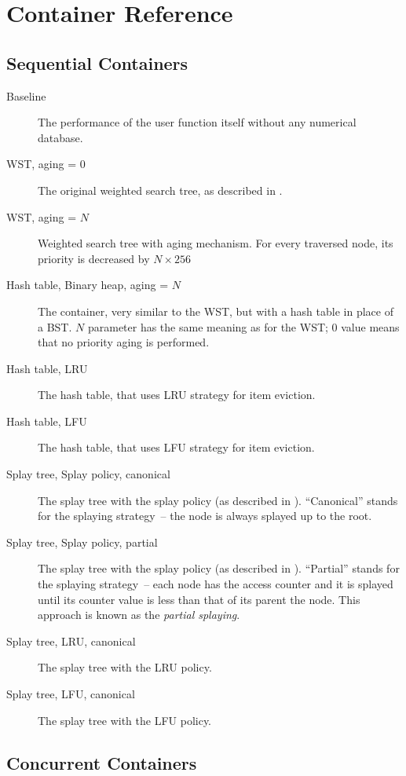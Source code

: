 
\chapter{Container Reference}


\section{Sequential Containers}
\begin{description}
\item[Baseline] The performance of the user function itself without any numerical database.
\item[WST, aging = 0] The original weighted search tree, as described in \cite{park94}.
\item[WST, aging = $N$] Weighted search tree with aging mechanism. For every traversed node, its priority is decreased by $N \times 256$
\item[Hash table, Binary heap, aging = $N$] The container, very similar to the WST, but with a hash table in place of a BST. $N$ parameter has the same meaning as for the WST; 0 value means that no priority aging is performed.
\item[Hash table, LRU] The hash table, that uses LRU strategy for item eviction.
\item[Hash table, LFU] The hash table, that uses LFU strategy for item eviction.

\item[Splay tree, Splay policy, canonical] The splay tree with the splay policy (as described in ). ``Canonical'' stands for the splaying strategy~-- the node is always splayed up to the root\cite{splay_tree}.
\item[Splay tree, Splay policy, partial] The splay tree with the splay policy (as described in ). ``Partial'' stands for the splaying strategy~-- each node has the access counter and it is splayed until its counter value is less than that of its parent the node. This approach is known as the \emph{partial splaying}\cite{partial_splaying}.
\item[Splay tree, LRU, canonical] The splay tree with the LRU policy.
\item[Splay tree, LFU, canonical] The splay tree with the LFU policy.
\end{description}

\section{Concurrent Containers}

